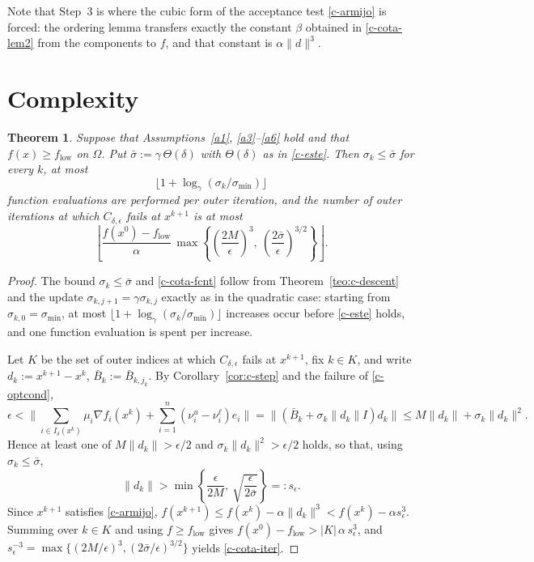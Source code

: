\documentclass[11pt]{article}
\newcommand{\flow}{f_{\mathrm{low}}}
\newtheorem{theorem}{Theorem}[section]
\begin{document}
Note that Step~3 is where the cubic form of the acceptance test
\eqref{c-armijo} is forced: the ordering lemma transfers exactly the constant
$\beta$ obtained in \eqref{c-cota-lem2} from the components to $f$, and that
constant is $\alpha\|d\|^3$.

\section{Complexity}

\begin{theorem} \label{teo:c-complexity}
Suppose that Assumptions~\ref{a1}, \ref{a3}--\ref{a6} hold and that
$f(x) \geq \flow$ on $\Omega$. Put
$\bar{\sigma} := \gamma\,\Theta(\delta)$ with $\Theta(\delta)$ as in
\eqref{c-este}. Then $\sigma_k \leq \bar{\sigma}$ for every $k$, at most
\begin{equation} \label{c-cota-fcnt}
\big\lfloor 1 + \log_\gamma(\sigma_k/\sigma_{\min}) \big\rfloor
\end{equation}
function evaluations are performed per outer iteration, and the number of outer
iterations at which $C_{\delta,\epsilon}$ fails at $x^{k+1}$ is at most
\begin{equation} \label{c-cota-iter}
\left\lfloor \frac{f(x^0) - \flow}{\alpha}\,
\max\left\{ \left(\frac{2M}{\epsilon}\right)^{3},\
\left(\frac{2\bar{\sigma}}{\epsilon}\right)^{3/2} \right\} \right\rfloor .
\end{equation}
\end{theorem}

\begin{proof}
The bound $\sigma_k \leq \bar\sigma$ and \eqref{c-cota-fcnt} follow from
Theorem~\ref{teo:c-descent} and the update $\sigma_{k,j+1} = \gamma\sigma_{k,j}$
exactly as in the quadratic case: starting from $\sigma_{k,0} = \sigma_{\min}$,
at most $\lfloor 1 + \log_\gamma(\sigma_k/\sigma_{\min})\rfloor$ increases occur
before \eqref{c-este} holds, and one function evaluation is spent per increase.

Let $K$ be the set of outer indices at which $C_{\delta,\epsilon}$ fails at
$x^{k+1}$, fix $k \in K$, and write $d_k := x^{k+1} - x^k$,
$\bar{B}_k := \bar{B}_{k,j_k}$. By Corollary~\ref{cor:c-step} and the failure
of \eqref{c-optcond},
\[
\epsilon < \Big\| \sum_{i \in I_\delta(x^k)} \mu_i\nabla f_i(x^k)
+ \sum_{i=1}^n(\nu^u_i - \nu^\ell_i)e_i \Big\|
= \big\| (\bar{B}_k + \sigma_k\|d_k\| I)d_k \big\|
\leq M\|d_k\| + \sigma_k\|d_k\|^2 .
\]
Hence at least one of $M\|d_k\| > \epsilon/2$ and
$\sigma_k\|d_k\|^2 > \epsilon/2$ holds, so that, using
$\sigma_k \leq \bar\sigma$,
\[
\|d_k\| > \min\left\{ \frac{\epsilon}{2M},\
\sqrt{\frac{\epsilon}{2\bar{\sigma}}} \right\} =: s_\epsilon .
\]
Since $x^{k+1}$ satisfies \eqref{c-armijo},
$f(x^{k+1}) \leq f(x^k) - \alpha\|d_k\|^3 < f(x^k) - \alpha s_\epsilon^3$.
Summing over $k \in K$ and using $f \geq \flow$ gives
$f(x^0) - \flow > |K|\,\alpha\, s_\epsilon^3$, and
$s_\epsilon^{-3} = \max\{(2M/\epsilon)^3, (2\bar\sigma/\epsilon)^{3/2}\}$
yields \eqref{c-cota-iter}.
\end{proof}
\end{document}
